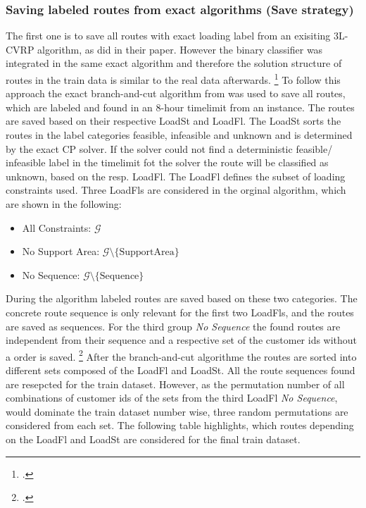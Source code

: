 \subsubsection{Saving labeled routes from exact algorithms (Save strategy)}
The first one is to save all routes with exact loading label from an exisiting \gls{3L-CVRP}
algorithm, as \cite{zhang_learning-based_2022} did in their paper. However the binary classifier
was integrated in the same exact algorithm
and therefore the solution structure of routes in the train data is similar to the real data afterwards. \footcite[cf.][]{zhang_learning-based_2022}
To follow this approach the exact branch-and-cut algorithm from \cite{tamke_branch-and-cut_2024} was
used to save all routes, which are labeled and found in an 8-hour timelimit from an instance. The routes
are saved based on their respective \gls{LoadSt} and \gls{LoadFl}. The \gls{LoadSt} sorts the routes in the
label categories feasible, infeasible and unknown and is determined by the exact \gls{CP} solver.
If the solver could not find a deterministic feasible/ infeasible label in the timelimit fot the solver the route
will be classified as unknown, based on the resp. \gls{LoadFl}.
The \gls{LoadFl} defines the subset of
loading constraints used. Three \glspl{LoadFl} are considered in the orginal algorithm, which are shown
in the following:
\begin{itemize}
    \item All Constraints: $\mathcal{G}$
    \item No Support Area: $\mathcal{G}\setminus \{\text{SupportArea}\}$
    \item No Sequence: $\mathcal{G}\setminus \{\text{Sequence}\}$
\end{itemize}
During the algorithm labeled routes are saved based on these two categories. The concrete route sequence
is only relevant for the first two \glspl{LoadFl}, and the routes are saved as sequences. For the third
group \textit{No Sequence} the found routes are independent from their sequence and a respective set
of the customer ids without a order is saved. \footcites[Retrieved from][]{tamke_repository_2024}[cf.][]{tamke_branch-and-cut_2024}
After the branch-and-cut algorithme the routes are sorted into different sets composed of the \gls{LoadFl} and \gls{LoadSt}.
All the route sequences found are resepcted for the train dataset. However, as the permutation number of all combinations
of customer ids of the sets from the third \gls{LoadFl} \textit{No Sequence}, would dominate the train dataset number wise,
three random permutations are considered from each set. The following table highlights, which routes depending on the
\gls{LoadFl} and \gls{LoadSt} are considered for the final train dataset.

